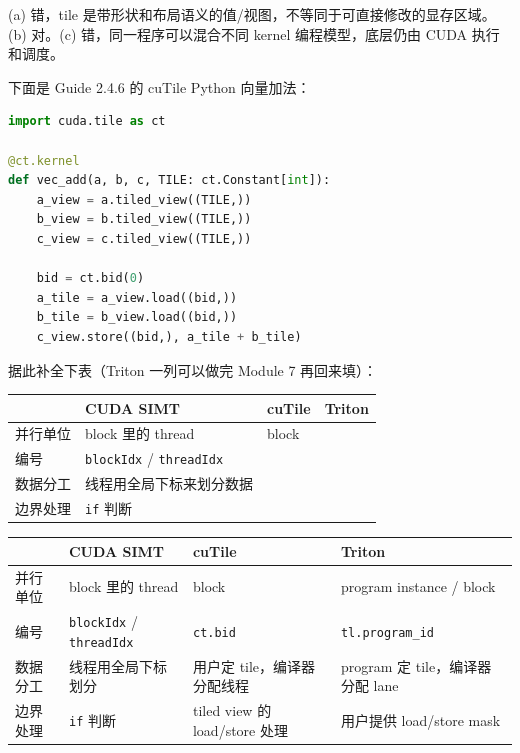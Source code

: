 \documentclass[11pt,a4paper,fontset=fandol]{ctexart}
\begin{document}
\begin{answer}
(a) 错，tile 是带形状和布局语义的值/视图，不等同于可直接修改的显存区域。
(b) 对。(c) 错，同一程序可以混合不同 kernel 编程模型，底层仍由 CUDA
执行和调度。
\end{answer}

下面是 Guide 2.4.6 的 cuTile Python 向量加法：

\begin{lstlisting}[language=Python]
import cuda.tile as ct

@ct.kernel
def vec_add(a, b, c, TILE: ct.Constant[int]):
    a_view = a.tiled_view((TILE,))
    b_view = b.tiled_view((TILE,))
    c_view = c.tiled_view((TILE,))

    bid = ct.bid(0)
    a_tile = a_view.load((bid,))
    b_tile = b_view.load((bid,))
    c_view.store((bid,), a_tile + b_tile)
\end{lstlisting}

据此补全下表（Triton 一列可以做完 Module 7 再回来填）：

\begin{center}\small
\begin{tabular}{@{}lp{8em}p{9em}p{9em}@{}}
\toprule
 & CUDA SIMT & cuTile & Triton \\
\midrule
并行单位 & block 里的 thread & block & \\
编号 & \texttt{blockIdx} / \texttt{threadIdx} &  & \\
数据分工 & 线程用全局下标来划分数据 &  & \\
边界处理 & \texttt{if} 判断 &  & \\
\bottomrule
\end{tabular}
\end{center}

\begin{answer}
\begin{center}\small
\begin{tabular}{@{}lp{8em}p{9em}p{9em}@{}}
\toprule
 & CUDA SIMT & cuTile & Triton \\
\midrule
并行单位 & block 里的 thread & block & program instance / block \\
编号 & \texttt{blockIdx} / \texttt{threadIdx} & \texttt{ct.bid} & \texttt{tl.program\_id} \\
数据分工 & 线程用全局下标划分 & 用户定 tile，编译器分配线程 & program 定 tile，编译器分配 lane \\
边界处理 & \texttt{if} 判断 & tiled view 的 load/store 处理 & 用户提供 load/store mask \\
\bottomrule
\end{tabular}
\end{center}
\end{answer}
\end{document}
